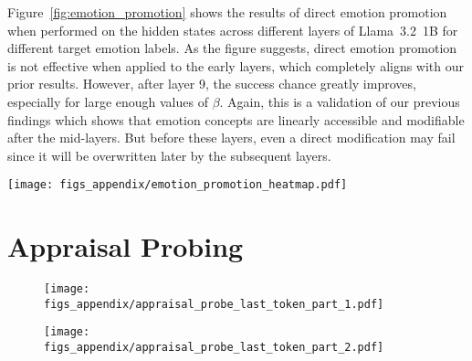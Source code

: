 Figure~\ref{fig:emotion_promotion} shows the results of direct emotion promotion when performed on the hidden states across different layers of Llama~3.2~1B for different target emotion labels. As the figure suggests, direct emotion promotion is not effective when applied to the early layers, which completely aligns with our prior results. However, after layer 9, the success chance greatly improves, especially for large enough values of $\beta$. Again, this is a validation of our previous findings which shows that emotion concepts are linearly accessible and modifiable after the mid-layers. But before these layers, even a direct modification may fail since it will be overwritten later by the subsequent layers.

\begin{figure*}[htbp]
    \centering
    \texttt{[image: figs\_appendix/emotion\_promotion\_heatmap.pdf]}
  \caption{The heatmap showing the success of direct emotion promotion when applied at different layers of Llama~3.2~1B. Success score 1 means that the intervention successfully changed all output labels to the target emotion label. Scores 0 means that the intervention made no changes to the output and -1 means that the intervention resulted to complete opposite results, even damaging the samples with the correct original label. All the interventions in this figure used an intervention of layer span size 3.}
  \label{fig:emotion_promotion}
\end{figure*} 

\section{Appraisal Probing} 
\label{app:appraisal_probing}

\begin{figure*}[t!]
    \centering
    \begin{subfigure}[t]{1.0\textwidth}
    \centering
    \texttt{[image: figs\_appendix/appraisal\_probe\_last\_token\_part\_1.pdf]}
    \end{subfigure}%
    \newline
    \newline
    \newline
    \begin{subfigure}[t]{1.0\textwidth}
        \centering
        \texttt{[image: figs\_appendix/appraisal\_probe\_last\_token\_part\_2.pdf]}
    \end{subfigure}
    \caption{Probing results for Llama~3.2~1B, conducted separately for each appraisal dimension across different activation locations and layers for the last token. Results are measured as the regression $R^2$ score on a held-out test set.} 
    \label{fig:Llama1B_app_probing}
\end{figure*}

